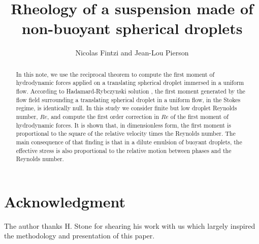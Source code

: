 \documentclass[12pt]{My_preprint}
\title{
    Rheology of a suspension made of non-buoyant spherical droplets
    }
\author[1,2]{Nicolas Fintzi and  Jean-Lou Pierson}
\begin{document}
\maketitle

\begin{abstract}
    In this note, we use the reciprocal theorem to compute the first moment of hydrodynamic forces applied on a translating spherical droplet immersed in a uniform flow. 
    According to Hadamard-Rybczynski solution \citep{kim2013microhydrodynamics}, the first moment generated by the flow field surrounding a translating spherical droplet in a uniform flow, in the Stokes regime, is identically null. 
    In this study we consider finite but low droplet Reynolds number, $Re$, and compute the first order correction in $Re$ of the first moment of hydrodynamic forces. 
    It is shown that, in dimensionless form, the first moment is proportional to the square of the relative velocity times the Reynolds number.  
    The main consequence of that finding is that in a dilute emulsion of buoyant droplets, the effective stress is also proportional to the relative motion between phases and the Reynolds number. 
\end{abstract}





\section*{Acknowledgment}

The author thanks H. Stone for shearing his work with us \citep{stone2001inertial} which largely inspired the methodology and presentation of this paper. 



\appendix


\end{document}
